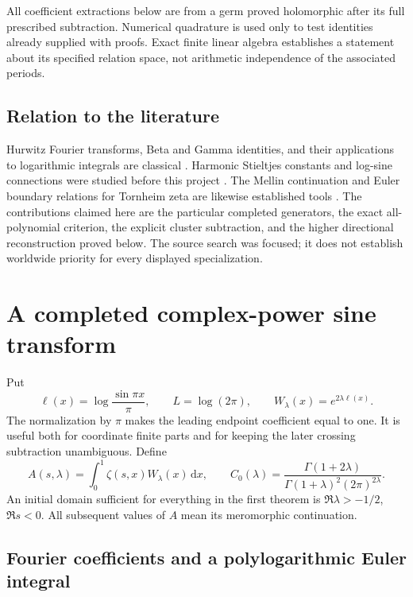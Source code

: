\documentclass[11pt]{article}
\numberwithin{equation}{section}
\theoremstyle{definition}
\theoremstyle{remark}
\newcommand{\dd}{\,\mathrm d}
\begin{document}
All coefficient extractions below are from a germ proved holomorphic
after its full prescribed subtraction. Numerical quadrature is used
only to test identities already supplied with proofs. Exact finite
linear algebra establishes a statement about its specified relation
space, not arithmetic independence of the associated periods.

\subsection{Relation to the literature}

Hurwitz Fourier transforms, Beta and Gamma identities, and their
applications to logarithmic integrals are classical
\cite{DLMFHurwitz,DLMFBeta,EspinosaMoll}. Harmonic Stieltjes constants
and log-sine connections were studied before this project
\cite{Kargin,Can}. The Mellin continuation and Euler boundary relations
for Tornheim zeta are likewise established tools \cite{BorweinDilcher}.
The contributions claimed here are the particular completed generators,
the exact all-polynomial criterion, the explicit cluster subtraction,
and the higher directional reconstruction proved below. The source
search was focused; it does not establish worldwide priority for every
displayed specialization.


\section{A completed complex-power sine transform}
\label{sec:beta}

Put
\begin{equation}\label{beta:weight}
 \ell(x)=\log\frac{\sin\pi x}{\pi},\qquad L=\log(2\pi),\qquad
 W_\lambda(x)=e^{2\lambda\ell(x)}.
\end{equation}
The normalization by $\pi$ makes the leading endpoint coefficient equal
to one. It is useful both for coordinate finite parts and for keeping
the later crossing subtraction unambiguous. Define
\begin{equation}\label{beta:A}
 A(s,\lambda)=\int_0^1\zeta(s,x)W_\lambda(x)\dd x,
 \qquad
 C_0(\lambda)=\frac{\Gamma(1+2\lambda)}
 {\Gamma(1+\lambda)^2(2\pi)^{2\lambda}}.
\end{equation}
An initial domain sufficient for everything in the first theorem is
$\Re\lambda>-1/2$, $\Re s<0$. All subsequent values of $A$ mean its
meromorphic continuation.

\subsection{Fourier coefficients and a polylogarithmic Euler integral}
\end{document}
